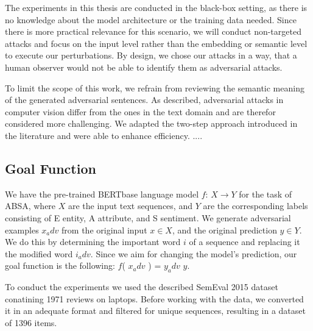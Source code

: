 The experiments in this thesis are conducted in the black-box setting, as there is no knowledge about the model architecture or the training data needed. Since there is more practical relevance for this scenario, we will conduct non-targeted attacks and focus on the input level rather than the embedding or semantic level to execute our perturbations. 
By design, we chose our attacks in a way, that a human observer would not be able to identify them as adversarial attacks. 

To limit the scope of this work, we refrain from reviewing the semantic meaning of the generated adversarial sentences.
As described, adversarial attacks in computer vision differ from the ones in the text domain and are therefor considered more challenging. We adapted the two-step approach introduced in the literature and were able to enhance efficiency. 
....

\subsection{Goal Function}
 \label{sec:goal_function_m}
We have the pre-trained BERTbase language model $f$: ${X \rightarrow Y}$ for the task of ABSA, where $X$ are the input text sequences, and $Y$ are the corresponding labels consisting of E entity, A attribute, and S sentiment. We generate adversarial examples ${x_adv}$ from the original input $x \in X$, and the original prediction $y \in Y$. We do this by determining the important word $i$ of a sequence and replacing it the modified word $i_adv$. Since we aim for changing the model's prediction, our goal function is the following: 
$f$( $x_adv$ ) = $y_adv$ \neq $y$.


To conduct the experiments we used the described SemEval 2015 dataset conatining 1971 reviews on laptops. Before working with the data, we converted it in an adequate format and filtered for unique sequences, resulting in a dataset of 1396 items. 

